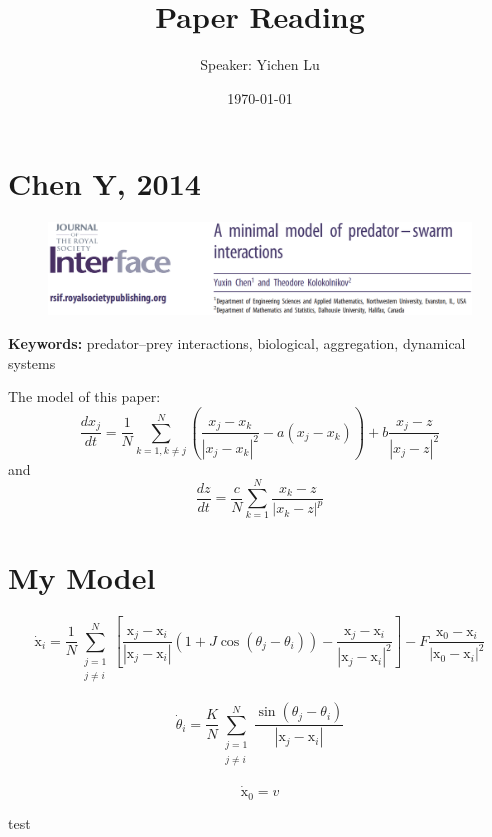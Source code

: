 \documentclass[10pt,aspectratio=43,mathserif,table]{beamer}
\title{Paper Reading}
\author{Speaker: Yichen Lu\quad \newline  \newline \quad }
\institute{\fontsize{8pt}{14pt}}
\date{\today}
\begin{document}
\section{Chen Y, 2014}

\begin{frame}
	\begin{figure}
		\centering
		\includegraphics[width=\textwidth]{ChenY2014Face.jpg}
	\end{figure}
	
	\textbf{Keywords:}  predator–prey interactions, biological, aggregation, dynamical systems
\end{frame}

\begin{frame}
    The model of this paper:
	$$
	\frac{dx_j}{dt}=\frac{1}{N}\sum_{k=1,k\ne j}^N{\left( \frac{x_j-x_k}{\left| x_j-x_k \right|^2}-a\left( x_j-x_k \right) \right) +b\frac{x_j-z}{\left| x_j-z \right|^2}}
	$$
	and
	$$
	\frac{dz}{dt}=\frac{c}{N}\sum_{k=1}^N{\frac{x_k-z}{\left| x_k-z \right|^p}}
	$$
\end{frame}

\section{My Model}

\begin{frame}
    $$
    \dot{\mathrm{x}}_i=\frac{1}{N}\sum_{\begin{array}{c}
        j=1\\
        j\ne i\\
    \end{array}}^N{\left[ \frac{\mathrm{x}_j-\mathrm{x}_i}{\left| \mathrm{x}_j-\mathrm{x}_i \right|}\left( 1+J\cos \left( \theta _j-\theta _i \right) \right) -\frac{\mathrm{x}_j-\mathrm{x}_i}{\left| \mathrm{x}_j-\mathrm{x}_i \right|^2} \right]}-F\frac{\mathrm{x}_0-\mathrm{x}_i}{\left| \mathrm{x}_0-\mathrm{x}_i \right|^2}
    $$

    $$
    \dot{\theta}_i=\frac{K}{N}\sum_{\begin{array}{c}
        j=1\\
        j\ne i\\
    \end{array}}^N{\frac{\sin \left( \theta _j-\theta _i \right)}{\left| \mathrm{x}_j-\mathrm{x}_i \right|}}
    $$

	$$
	\dot{\mathrm{x}}_0=v
	$$

	test

\end{frame}




\end{document}
